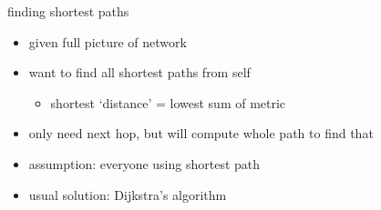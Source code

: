 \usetikzlibrary{arrows.meta}
\begin{frame}{finding shortest paths}
    \begin{itemize}
    \item given full picture of network
    \item want to find all shortest paths from self 
        \begin{itemize}
        \item shortest `distance' = lowest sum of metric
        \end{itemize}
    \item only need next hop, but will compute whole path to find that
    \item assumption: everyone using shortest path
    \item usual solution: Dijkstra's algorithm
    \end{itemize}
\end{frame}
